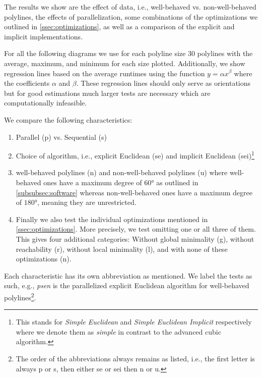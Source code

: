 The results we show are the effect of data, i.e., well-behaved vs. non-well-behaved polylines, the effects of parallelization, some combinations of the optimizations we outlined in \cref{ssec:optimizations}, as well as a comparison of the explicit and implicit implementations. 

For all the following diagrams we use for each polyline size 30 polylines with the average, maximum, and minimum for each size plotted. Additionally, we show regression lines based on the average runtimes using the function \(y = \alpha x^\beta\) where the coefficients \(\alpha\) and \(\beta\). These regression lines should only serve as orientations but for good estimations much larger tests are necessary which are computationally infeasible.

We compare the following characteristics: 
\begin{enumerate}
  \item Parallel (p) vs. Sequential (s)
  \item Choice of algorithm, i.e., explicit Euclidean (se) and implicit Euclidean (sei)\footnote{This stands for \emph{Simple Euclidean} and \emph{Simple Euclidean Implicit} respectively where we denote them as \emph{simple} in contrast to the advanced cubic algorithm.}
  \item well-behaved polylines (n) and non-well-behaved polylines (u) where well-behaved ones have a maximum degree of \(60\)° as outlined in \cref{subsubsec:software} whereas non-well-behaved ones have a maximum degree of \(180\)°, meaning they are unrestricted. 
  \item Finally we also test the individual optimizations mentioned in \cref{ssec:optimizations}. More precisely, we test omitting one or all three of them. This gives four additional categories: Without global minimality (g), without reachability (r), without local minimality (l), and with none of these optimizations (n).
\end{enumerate}

Each characteristic has its own abbreviation as mentioned. We label the tests as such, e.g., \emph{psen} is the parallelized explicit Euclidean algorithm for well-behaved polylines\footnote{The order of the abbreviations always remains as listed, i.e., the first letter is always p or s, then either se or sei then n or u.}.

